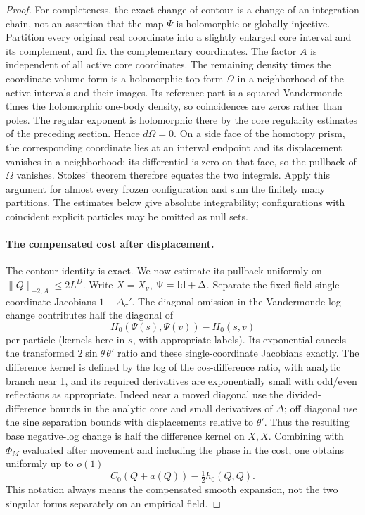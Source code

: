 \begin{proof}
For completeness, the exact change of contour is a change of an
integration chain, not an assertion that the map \(\Psi\) is
holomorphic or globally injective. Partition every original real
coordinate into a slightly enlarged core interval and its complement,
and fix the complementary coordinates. The factor \(A\) is independent
of all active core coordinates. The remaining density times the
coordinate volume form is a holomorphic top form \(\Omega\) in a
neighborhood of the active intervals and their images. Its reference
part is a squared Vandermonde times the holomorphic one-body density,
so coincidences are zeros rather than poles. The regular exponent is
holomorphic there by the core regularity estimates of the preceding
section. Hence \(d\Omega=0\). On a side face of the homotopy prism,
the corresponding coordinate lies at an interval endpoint and its
displacement vanishes in a neighborhood; its differential is zero
on that face, so the pullback of \(\Omega\) vanishes. Stokes' theorem
therefore equates the two integrals. Apply this argument for almost
every frozen configuration and sum the finitely many partitions.
The estimates below give absolute integrability; configurations with
coincident explicit particles may be omitted as null sets.

\paragraph{The compensated cost after displacement.}
The contour identity is exact. We now estimate its pullback uniformly on \(\|Q\|_{-2,A}\le 2L^D\). Write \(X=X_\nu\), \(\Psi={\rm Id}+\Delta\). Separate the fixed-field single-coordinate Jacobians \(1+\Delta_\sigma'\). The diagonal omission in the Vandermonde log change contributes half the diagonal of
\[
 H_0(\Psi(s),\Psi(v))-H_0(s,v)
\]
per particle (kernels here in \(s\), with appropriate labels). Its exponential cancels the transformed \(2\sin\theta\,\theta'\) ratio and these single-coordinate Jacobians exactly. The difference kernel is defined by the log of the cos-difference ratio, with analytic branch near 1, and its required derivatives are exponentially small with odd/even reflections as appropriate. Indeed near a moved diagonal use the divided-difference bounds in the analytic core and small derivatives of \(\Delta\); off diagonal use the sine separation bounds with displacements relative to \(\theta'\). Thus the resulting base negative-log change is half the difference kernel on \(X,X\). Combining with \(\Phi_M\) evaluated after movement and including the phase in the cost, one obtains uniformly up to \(o(1)\)
\begin{equation}
 C_0(Q+a(Q))-\tfrac12 h_0(Q,Q).
 \label{eq:G-19}
\end{equation}
This notation always means the compensated smooth expansion, not the two singular forms separately on an empirical field.


\end{proof}
